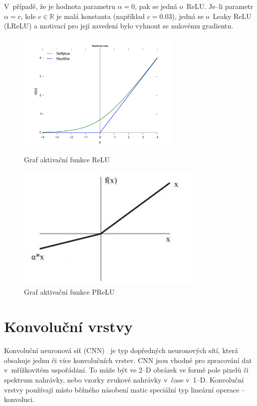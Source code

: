 V~případě, že je hodnota parametru $\alpha=0$, pak se jedná o~ReLU. Je--li parametr $\alpha = c$, kde $c\in\mathbb{R}$ je malá konstanta (například $c = 0.03$), jedná se o~Leaky ReLU (LReLU) a motivací pro její zavedení bylo vyhnout se nulovému gradientu.


\begin{figure}[H]
    \centering
    \begin{minipage}{0.45\textwidth}
        \centering
        \includegraphics[width=0.7\textwidth]{obrazky-figures/ReLU.png}
        \caption{\label{fig:relu}Graf aktivační funkce ReLU}
    \end{minipage}\hfill
    \begin{minipage}{0.45\textwidth}
        \centering
        \includegraphics[width=0.8\textwidth]{obrazky-figures/prelu.jpg}
        \caption{\label{fig:prelu}Graf aktivační funkce PReLU}
    \end{minipage}
\end{figure}


\section{Konvoluční vrstvy}
Konvoluční neuronová síť (CNN)~\cite{6795724} je typ dopředných neuronových sítí, která obsahuje jednu či více konvolučních vrstev. CNN jsou vhodné pro zpracování dat v~mřížkovitém uspořádání. To může být ve 2--D obrázek ve formě pole pixelů či spektrum nahrávky, nebo vzorky zvukové nahrávky v~čase v~1--D. Konvoluční vrstvy používají místo běžného násobení matic speciální typ lineární operace -- konvoluci.

